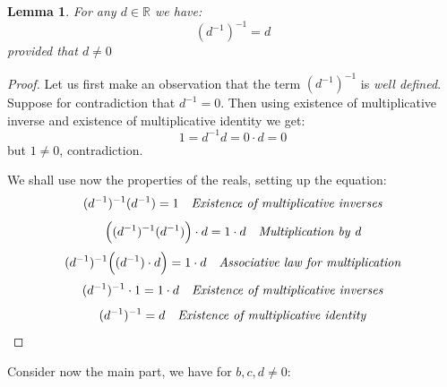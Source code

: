 \documentclass{article}
\newtheorem*{lemma}{Lemma}
\begin{document}
\begin{lemma}
	For any \(d \in \mathbb{R}\) we have:
	\begin{equation*}
		(d^{-1})^{-1} = d
	\end{equation*}
	provided that \(d \neq 0\)
\end{lemma}
\begin{proof}
	Let us first make an observation that the term \((d^{-1})^{-1}\) is \emph{well defined}.
	Suppose for contradiction that \(d^{-1} = 0\). Then using existence of multiplicative inverse and
	existence of multiplicative identity we get:
	\begin{equation*}
		1 = d^{-1}d = 0 \cdot d = 0
	\end{equation*}
	but \(1 \neq 0\), contradiction.

	We shall use now the properties of the reals, setting up the equation:
	\begin{equation*}
		(d^{-1})^{-1}(d^{-1}) = 1 \ \ \ \emph{Existence of multiplicative inverses}
	\end{equation*}
	\begin{equation*}
		\Big((d^{-1})^{-1}(d^{-1})\Big) \cdot d = 1 \cdot d \ \ \ \emph{Multiplication by d}
	\end{equation*}
	\begin{equation*}
		(d^{-1})^{-1}\Big((d^{-1}) \cdot d\Big) = 1 \cdot d \ \ \ \emph{Associative law for multiplication}
	\end{equation*}
	\begin{equation*}
		(d^{-1})^{-1} \cdot 1 = 1 \cdot d \ \ \ \emph{Existence of multiplicative inverses}
	\end{equation*}
	\begin{equation*}
		(d^{-1})^{-1} = d \ \ \ \emph{Existence of multiplicative identity}
	\end{equation*}
\end{proof}

Consider now the main part, we have for \(b, c, d \neq 0\):
\end{document}
